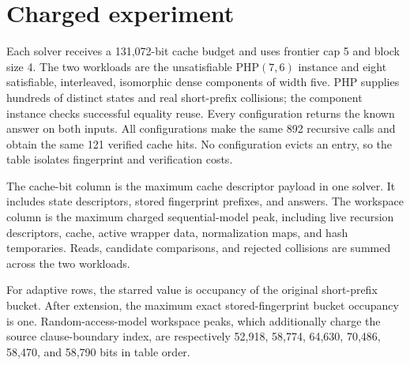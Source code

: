 \documentclass[11pt]{article}
\begin{document}
\section{Charged experiment}
Each solver receives a 131,072-bit cache budget and uses frontier cap 5 and
block size 4.  The two workloads are the unsatisfiable PHP$(7,6)$ instance and
eight satisfiable, interleaved, isomorphic dense components of width five.
PHP supplies hundreds of distinct states and real short-prefix collisions;
the component instance checks successful equality reuse.  Every configuration
returns the known answer on both inputs.  All configurations make the same 892
recursive calls and obtain the same 121 verified cache hits.  No configuration
evicts an entry, so the table isolates fingerprint and verification costs.

The cache-bit column is the maximum cache descriptor payload in one solver.
It includes state descriptors, stored fingerprint prefixes, and answers.  The
workspace column is the maximum charged sequential-model peak, including live
recursion descriptors, cache, active wrapper data, normalization maps, and
hash temporaries.  Reads, candidate comparisons, and rejected collisions are
summed across the two workloads.

\begin{center}
\end{center}

For adaptive rows, the starred value is occupancy of the original short-prefix
bucket.  After extension, the maximum exact stored-fingerprint bucket occupancy
is one.  Random-access-model workspace peaks, which additionally charge the
source clause-boundary index, are respectively 52,918, 58,774, 64,630, 70,486,
58,470, and 58,790 bits in table order.
\end{document}
